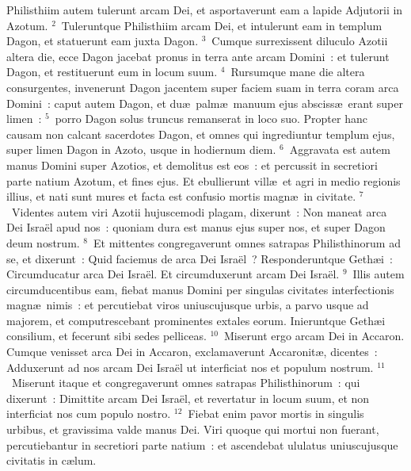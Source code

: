 \lettrine[lines=10,image=true,loversize=0.05,lraise=-0.03]{P}{}hilisthiim autem tulerunt arcam Dei, et asportaverunt eam a lapide Adjutorii in Azotum.
${}^{2}$~Tuleruntque Philisthiim arcam Dei, et intulerunt eam in templum Dagon, et statuerunt eam juxta Dagon.
${}^{3}$~Cumque surrexissent diluculo Azotii altera die, ecce Dagon jacebat pronus in terra ante arcam Domini~: et tulerunt Dagon, et restituerunt eum in locum suum.
${}^{4}$~Rursumque mane die altera consurgentes, invenerunt Dagon jacentem super faciem suam in terra coram arca Domini~: caput autem Dagon, et du\ae\ palm\ae\ manuum ejus absciss\ae\ erant super limen~:
${}^{5}$~porro Dagon solus truncus remanserat in loco suo. Propter hanc causam non calcant sacerdotes Dagon, et omnes qui ingrediuntur templum ejus, super limen Dagon in Azoto, usque in hodiernum diem.
${}^{6}$~Aggravata est autem manus Domini super Azotios, et demolitus est eos~: et percussit in secretiori parte natium Azotum, et fines ejus. Et ebullierunt vill\ae\ et agri in medio regionis illius, et nati sunt mures et facta est confusio mortis magn\ae\ in civitate.
${}^{7}$~Videntes autem viri Azotii hujuscemodi plagam, dixerunt~: Non maneat arca Dei Isra\"el apud nos~: quoniam dura est manus ejus super nos, et super Dagon deum nostrum.
${}^{8}$~Et mittentes congregaverunt omnes satrapas Philisthinorum ad se, et dixerunt~: Quid faciemus de arca Dei Isra\"el~? Responderuntque Geth\ae i~: Circumducatur arca Dei Isra\"el. Et circumduxerunt arcam Dei Isra\"el.
${}^{9}$~Illis autem circumducentibus eam, fiebat manus Domini per singulas civitates interfectionis magn\ae\ nimis~: et percutiebat viros uniuscujusque urbis, a parvo usque ad majorem, et computrescebant prominentes extales eorum. Inieruntque Geth\ae i consilium, et fecerunt sibi sedes pelliceas.
${}^{10}$~Miserunt ergo arcam Dei in Accaron. Cumque venisset arca Dei in Accaron, exclamaverunt Accaronit\ae , dicentes~: Adduxerunt ad nos arcam Dei Isra\"el ut interficiat nos et populum nostrum.
${}^{11}$~Miserunt itaque et congregaverunt omnes satrapas Philisthinorum~: qui dixerunt~: Dimittite arcam Dei Isra\"el, et revertatur in locum suum, et non interficiat nos cum populo nostro.
${}^{12}$~Fiebat enim pavor mortis in singulis urbibus, et gravissima valde manus Dei. Viri quoque qui mortui non fuerant, percutiebantur in secretiori parte natium~: et ascendebat ululatus uniuscujusque civitatis in c\ae lum.

